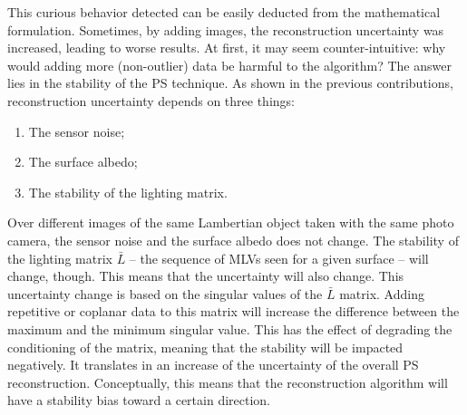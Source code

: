 

This curious behavior detected can be easily deducted from the mathematical formulation. Sometimes, by adding images, the reconstruction uncertainty was increased, leading to worse results. At first, it may seem counter-intuitive: why would adding more (non-outlier) data be harmful to the algorithm? The answer lies in the stability of the PS technique. As shown in the previous contributions, reconstruction uncertainty depends on three things:
\begin{enumerate}
  \item The sensor noise;
  \item The surface albedo;
  \item The stability of the lighting matrix.
\end{enumerate}
Over different images of the same Lambertian object taken with the same photo camera, the sensor noise and the surface albedo does not change. The stability of the lighting matrix $\bar{L}$ -- the sequence of MLVs seen for a given surface -- will change, though. This means that the uncertainty will also change. This uncertainty change is based on the singular values of the $\bar{L}$ matrix. Adding repetitive or coplanar data to this matrix will increase the difference between the maximum and the minimum singular value. This has the effect of degrading the conditioning of the matrix, meaning that the stability will be impacted negatively. It translates in an increase of the uncertainty of the overall PS reconstruction. Conceptually, this means that the reconstruction algorithm will have a stability bias toward a certain direction.

